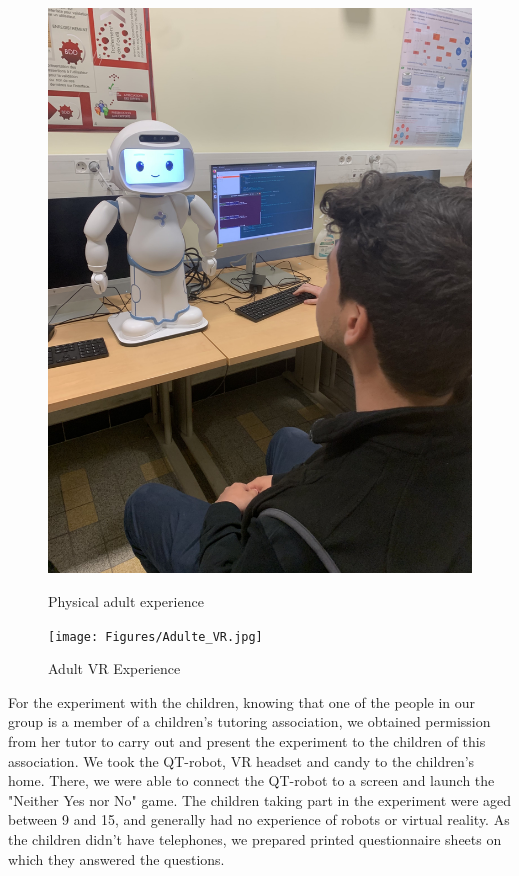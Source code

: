 \begin{figure}[htp]
    \centering
    \begin{minipage}[c]{0.5\textwidth}
        \centering
        \includegraphics[width=1.0\textwidth, height=0.3\textheight,keepaspectratio]{Figures/ryan.jpg}
        \caption{Physical adult experience}
    \end{minipage}%
    \begin{minipage}[c]{0.5\textwidth}
        \centering
        \texttt{[image: Figures/Adulte\_VR.jpg]}
        \caption{Adult VR Experience}
    \end{minipage}
\end{figure}
\newpage
For the experiment with the children, knowing that one of the people in our group is a member of a children's tutoring association, we obtained permission from her tutor to carry out and present the experiment to the children of this association. We took the QT-robot, VR headset and candy to the children's home. There, we were able to connect the QT-robot to a screen and launch the "Neither Yes nor No" game. The children taking part in the experiment were aged between 9 and 15, and generally had no experience of robots or virtual reality. As the children didn't have telephones, we prepared printed questionnaire sheets on which they answered the questions.\\
